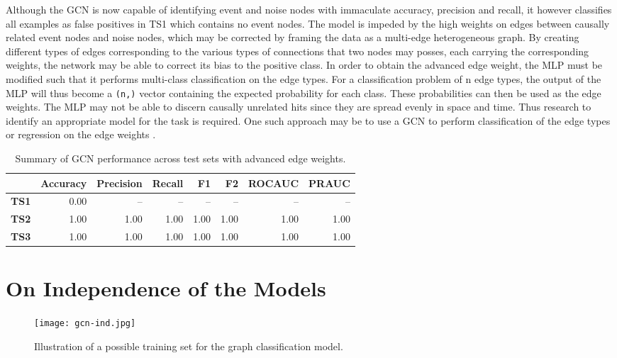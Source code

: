 Although the GCN is now capable of identifying event and noise nodes
with immaculate accuracy, precision and recall, it however classifies
all examples as false positives in TS1 which contains no event nodes.
The model is impeded by the high weights on edges between causally
related event nodes and noise nodes, which may be corrected by framing
the data as a multi-edge heterogeneous graph. By creating different
types of edges corresponding to the various types of connections that
two nodes may posses, each carrying the corresponding weights, the
network may be able to correct its bias to the positive class. In
order to obtain the advanced edge weight, the MLP must be modified
such that it performs multi-class classification on the edge types.
For a classification problem of n edge types, the output of the MLP
will thus become a \texttt{(n,)} vector containing the expected
probability for each class. These probabilities can then be used as
the edge weights. The MLP may not be able to discern causally
unrelated hits since they are spread evenly in space and time. Thus
research to identify an appropriate model for the task is required.
One such approach may be to use a GCN to perform classification of the
edge types or regression on the edge weights
\cite{gong2019exploiting}.

\begin{table}[htb]
  \centering
  \caption{Summary of GCN performance across test sets with advanced
    edge weights.}
  \begin{tabular}{lrrrrrrr}
    \hline
    & Accuracy & Precision & Recall & F1 & F2 & ROCAUC & PRAUC \\
    \hline
    \textbf{TS1} & 0.00 & -- & -- & -- & -- & -- & -- \\
    \textbf{TS2} & 1.00 & 1.00 & 1.00 & 1.00 & 1.00 & 1.00 & 1.00 \\
    \textbf{TS3} & 1.00 & 1.00 & 1.00 & 1.00 & 1.00 & 1.00 & 1.00 \\
    \hline
  \end{tabular}
  \label{tab:gcn-results-adv}
\end{table}

\section{On Independence of the Models}

\begin{figure}[htb]
  \centering
  \texttt{[image: gcn-ind.jpg]}
  \caption{Illustration of a possible training set for the graph
    classification model.}
  \label{fig:gcn-ind}
\end{figure}
      
